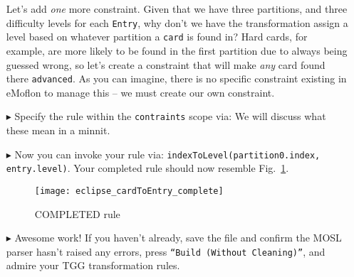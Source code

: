 \begin{itemize}
Let's add \emph{one} more constraint. Given that we have three partitions, and three difficulty levels for each \texttt{Entry}, why don't we have the
transformation assign a level based on whatever partition a \texttt{card} is found in? Hard cards, for example, are more likely to be found in the first
partition due to always being guessed wrong, so let's create a constraint that will make \emph{any} card found there \texttt{advanced}. As you can imagine,
there is no specific constraint existing in eMoflon to manage this -- we must create our own constraint.

\item[$\blacktriangleright$] Specify the rule within the \texttt{contraints} scope via:  We will discuss what
these mean in a minnit.

\item[$\blacktriangleright$] Now you can invoke your rule via: \texttt{indexToLevel(partition0.index, entry.level)}. Your completed rule should now resemble
Fig.~\ref{fig:c2eDone}.

\begin{figure}[htbp]
\begin{center}
  \texttt{[image: eclipse\_cardToEntry\_complete]}
  \caption{COMPLETED rule}
  \label{fig:c2eDone}
\end{center}
\end{figure}

\item[$\blacktriangleright$] Awesome work! If you haven't already, save the file and confirm the MOSL parser hasn't raised any errors, press
\texttt{``Build (Without Cleaning)''}, and admire your TGG transformation rules. 

\end{itemize}
